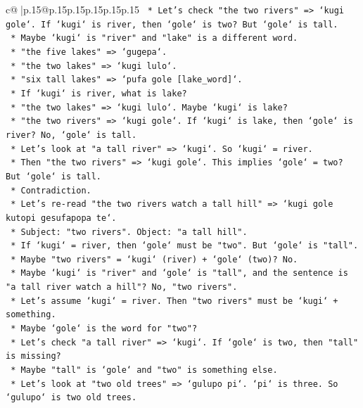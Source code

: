 \documentclass{article}
\begin{document}
{\begin{supertabular}{c@{$\;$}|p{.15\linewidth}@{}p{.15\linewidth}p{.15\linewidth}p{.15\linewidth}p{.15\linewidth}p{.15\linewidth}}
{{{\texttt{            *   Let's check "the two rivers" => `kugi gole`. If `kugi` is river, then `gole` is two? But `gole` is tall.} \\
\texttt{            *   Maybe `kugi` is "river" and "lake" is a different word.} \\
\texttt{            *   "the five lakes" => `gugepa`.} \\
\texttt{            *   "the two lakes" => `kugi lulo`.} \\
\texttt{            *   "six tall lakes" => `pufa gole {[}lake\_word{]}`.} \\
\texttt{            *   If `kugi` is river, what is lake?} \\
\texttt{            *   "the two lakes" => `kugi lulo`. Maybe `kugi` is lake?} \\
\texttt{            *   "the two rivers" => `kugi gole`. If `kugi` is lake, then `gole` is river? No, `gole` is tall.} \\
\texttt{            *   Let's look at "a tall river" => `kugi`. So `kugi` = river.} \\
\texttt{            *   Then "the two rivers" => `kugi gole`. This implies `gole` = two? But `gole` is tall.} \\
\texttt{            *   Contradiction.} \\
\texttt{            *   Let's re{-}read "the two rivers watch a tall hill" => `kugi gole kutopi gesufapopa te`.} \\
\texttt{            *   Subject: "two rivers". Object: "a tall hill".} \\
\texttt{            *   If `kugi` = river, then `gole` must be "two". But `gole` is "tall".} \\
\texttt{            *   Maybe "two rivers" = `kugi` (river) + `gole` (two)? No.} \\
\texttt{            *   Maybe `kugi` is "river" and `gole` is "tall", and the sentence is "a tall river watch a hill"? No, "two rivers".} \\
\texttt{            *   Let's assume `kugi` = river. Then "two rivers" must be `kugi` + something.} \\
\texttt{            *   Maybe `gole` is the word for "two"?} \\
\texttt{            *   Let's check "a tall river" => `kugi`. If `gole` is two, then "tall" is missing?} \\
\texttt{            *   Maybe "tall" is `gole` and "two" is something else.} \\
\texttt{            *   Let's look at "two old trees" => `gulupo pi`. `pi` is three. So `gulupo` is two old trees.} \\
}}}
\end{supertabular}}
\end{document}
